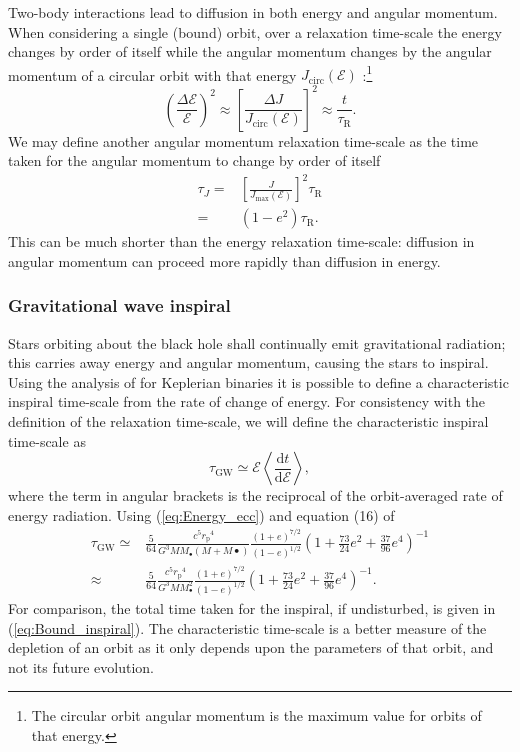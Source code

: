 \documentclass[useAMS,usedcolumn,usegraphicx,usenatbib]{mn2e}
\newcommand{\eqnref}[1]{(\ref{eq:#1})}
\newcommand{\sub}[1]{\ensuremath{_\mathrm{#1}}}
\newcommand{\dd}{\ensuremath{\mathrm{d}}}
\newcommand{\diff}[2]{\ensuremath{\frac{\dd {#1}}{\dd {#2}}}}
\begin{document}
Two-body interactions lead to diffusion in both energy and angular momentum. When considering a single (bound) orbit, over a relaxation time-scale the energy changes by order of itself while the angular momentum changes by the angular momentum of a circular orbit with that energy $J\sub{circ}(\mathcal{E})$ \citep{Lightman1977, Rauch1996, Hopman2005}:\footnote{The circular orbit angular momentum is the maximum value for orbits of that energy.}
\begin{equation}
\left(\frac{\Delta\mathcal{E}}{\mathcal{E}}\right)^{2} \approx \left[\frac{\Delta J}{J\sub{circ}(\mathcal{E})}\right]^{2} \approx \frac{t}{\tau\sub{R}}.
\label{eq:diffuse-relax}
\end{equation}
We may define another angular momentum relaxation time-scale as the time taken for the angular momentum to change by order of itself \citep{Merritt2011}
\begin{align}
\tau_{J} = {} & \left[\frac{J}{J\sub{max}(\mathcal{E})}\right]^2\tau\sub{R} \\
 = {} & \left(1 - e^2\right) \tau\sub{R}.
\label{eq:J-time}
\end{align}
This can be much shorter than the energy relaxation time-scale: diffusion in angular momentum can proceed more rapidly than diffusion in energy.

\subsubsection{Gravitational wave inspiral}\label{sec:GW-in}

Stars orbiting about the black hole shall continually emit gravitational radiation; this carries away energy and angular momentum, causing the stars to inspiral. Using the analysis of \citet{Peters1963,Peters1964} for Keplerian binaries it is possible to define a characteristic inspiral time-scale from the rate of change of energy. For consistency with the definition of the relaxation time-scale, we will define the characteristic inspiral time-scale as \citep{MiraldaEscude2000, Merritt2011}
\begin{equation}
\tau\sub{GW} \simeq \mathcal{E}\left\langle\diff{t}{\mathcal{E}}\right\rangle,
\label{eq:tGW-def}
\end{equation}
where the term in angular brackets is the reciprocal of the orbit-averaged rate of energy radiation. Using \eqnref{Energy_ecc} and equation (16) of \citet{Peters1963}
\begin{align}
\tau\sub{GW} \simeq {} & \frac{5}{64}\frac{c^5r\sub{p}^4}{G^3MM_\bullet\left(M + M\bullet\right)}\frac{(1+e)^{7/2}}{(1-e)^{1/2}}\left(1+\frac{73}{24}e^2 + \frac{37}{96}e^4\right)^{-1} \\
 \approx {} & \frac{5}{64}\frac{c^5r\sub{p}^4}{G^3MM_\bullet^2}\frac{(1+e)^{7/2}}{(1-e)^{1/2}}\left(1+\frac{73}{24}e^2 + \frac{37}{96}e^4\right)^{-1}.
\end{align}
For comparison, the total time taken for the inspiral, if undisturbed, is given in \eqnref{Bound_inspiral}. The characteristic time-scale is a better measure of the depletion of an orbit as it only depends upon the parameters of that orbit, and not its future evolution.
\end{document}
